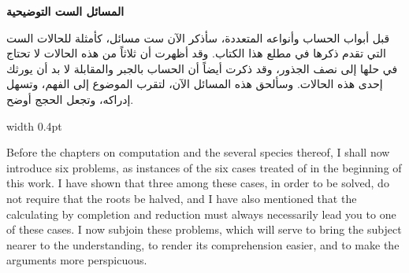 \documentclass[11pt,a4paper]{book}
\begin{document}
\noindent\begin{minipage}[t]{0.48\textwidth}
\raggedleft

\begin{Arabic}
\textbf{المسائل الست التوضيحية}

قبل أبواب الحساب وأنواعه المتعددة، سأذكر الآن ست مسائل، كأمثلة للحالات الست التي تقدم ذكرها في مطلع هذا الكتاب. وقد أظهرت أن ثلاثاً من هذه الحالات لا تحتاج في حلها إلى نصف الجذور، وقد ذكرت أيضاً أن الحساب بالجبر والمقابلة لا بد أن يورثك إحدى هذه الحالات. وسألحق هذه المسائل الآن، لتقرب الموضوع إلى الفهم، وتسهل إدراكه، وتجعل الحجج أوضح.
\end{Arabic}

\end{minipage}%
\hfill\vrule width 0.4pt\hfill
\begin{minipage}[t]{0.48\textwidth}
\raggedright

Before the chapters on computation and the several species thereof, I shall now introduce six problems, as instances of the six cases treated of in the beginning of this work. I have shown that three among these cases, in order to be solved, do not require that the roots be halved, and I have also mentioned that the calculating by completion and reduction must always necessarily lead you to one of these cases. I now subjoin these problems, which will serve to bring the subject nearer to the understanding, to render its comprehension easier, and to make the arguments more perspicuous.

\end{minipage}
\vspace{0.3cm}

\vspace{0.5cm}
\end{document}
